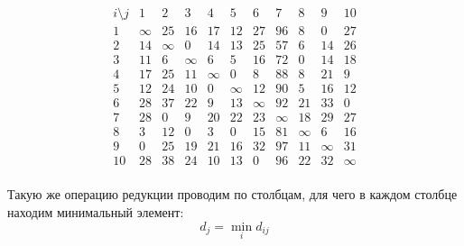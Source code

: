 \documentclass{article}
\begin{document}
\[
    \begin{array}{c|cccccccccc}
        i \setminus j & 1      & 2      & 3      & 4      & 5      & 6      & 7      & 8      & 9      & 10     \\
        \hline
        1             & \infty & 25     & 16     & 17     & 12     & 27     & 96     & 8      & 0      & 27     \\
        2             & 14     & \infty & 0      & 14     & 13     & 25     & 57     & 6      & 14     & 26     \\
        3             & 11     & 6      & \infty & 6      & 5      & 16     & 72     & 0      & 14     & 18     \\
        4             & 17     & 25     & 11     & \infty & 0      & 8      & 88     & 8      & 21     & 9      \\
        5             & 12     & 24     & 10     & 0      & \infty & 12     & 90     & 5      & 16     & 12     \\
        6             & 28     & 37     & 22     & 9      & 13     & \infty & 92     & 21     & 33     & 0      \\
        7             & 28     & 0      & 9      & 20     & 22     & 23     & \infty & 18     & 29     & 27     \\
        8             & 3      & 12     & 0      & 3      & 0      & 15     & 81     & \infty & 6      & 16     \\
        9             & 0      & 25     & 19     & 21     & 16     & 32     & 97     & 11     & \infty & 31     \\
        10            & 28     & 38     & 24     & 10     & 13     & 0      & 96     & 22     & 32     & \infty \\
    \end{array}
\]

Такую же операцию редукции проводим по столбцам, для чего в каждом столбце находим минимальный элемент:
\[ d_j = \min_i d_{ij} \]
\end{document}
